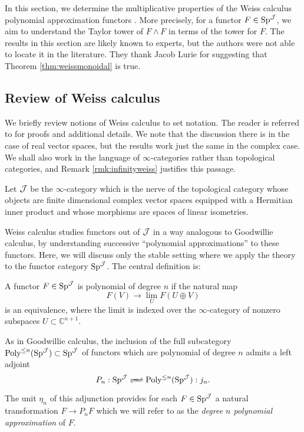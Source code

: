 In this section, we determine the multiplicative properties of the Weiss calculus polynomial approximation functors \cite{Weiss}.  More precisely, for a functor $F\in \operatorname{\mathrm{Sp}}^{\operatorname{\mathcal{J}}}$, we aim to understand the Taylor tower of $F\wedge F$ in terms of the tower for $F.$  The results in this section are likely known to experts, but the authors were not able to locate it in the literature.  They thank Jacob Lurie for suggesting that Theorem \ref{thm:weissmonoidal} is true.

\subsection{Review of Weiss calculus}
We briefly review notions of Weiss calculus to set notation.  The reader is referred to \cite{Weiss} for proofs and additional details.  We note that the discussion there is in the case of real vector spaces, but the results work just the same in the complex case.  We shall also work in the language of $\infty$-categories rather than topological categories, and Remark \ref{rmk:infinityweiss} justifies this passage.  

Let $\operatorname{\mathcal{J}}$ be the $\infty$-category which is the nerve of the topological category whose objects are finite dimensional complex vector spaces equipped with a Hermitian inner product and whose morphisms are spaces of linear isometries.  

Weiss calculus studies functors out of $\operatorname{\mathcal{J}}$ in a way analogous to Goodwillie calculus, by understanding successive ``polynomial approximations'' to these functors.  Here, we will discuss only the stable setting where we apply the theory to the functor category $\operatorname{\mathrm{Sp}}^{\operatorname{\mathcal{J}}}$. The central definition is:

\begin{dfn}\label{dfn:polyfun}
A functor $F\in \operatorname{\mathrm{Sp}}^{\operatorname{\mathcal{J}}}$ is polynomial of degree $n$ if the natural map $$F(V) \to \lim_U F(U\oplus V)$$ is an equivalence, where the limit is indexed over the $\infty$-category of nonzero subspaces $U\subset \mathbb{C}^{n+1}.$
\end{dfn}

As in Goodwillie calculus, the inclusion of the full subcategory $\operatorname{\text{Poly}}^{\leq n}(\operatorname{\mathrm{Sp}}^{\operatorname{\mathcal{J}}}) \subset \operatorname{\mathrm{Sp}}^{\operatorname{\mathcal{J}}}$ of functors which are polynomial of degree $n$ admits a left adjoint $$P_n: \Sp^{\J} \xrightleftharpoons{\quad} \Poly^{\leq n}(\Sp^{\J}): j_n.$$ %
 The unit $\eta_n$ of this adjunction provides for each $F\in \operatorname{\mathrm{Sp}}^{\operatorname{\mathcal{J}}}$ a natural transformation $F \to P_nF$ which we will refer to as the \emph{degree $n$ polynomial approximation} of $F$. 

